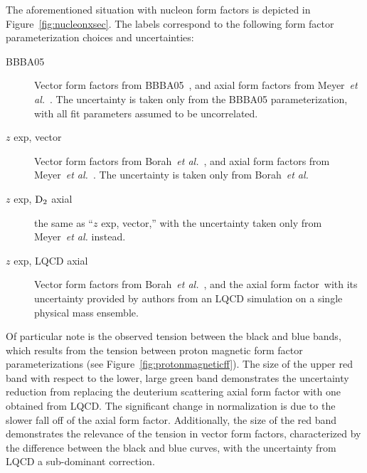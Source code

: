 \documentclass{ar-1col}
\newcommand{\change}[1]{{\color{red} #1}}
\def\asm#1{{\color{blue}#1}}
\def\del#1{}
\def\done#1{{\color{brown}#1}}
\begin{document}
The aforementioned situation with nucleon form factors is depicted in Figure~\ref{fig:nucleonxsec}.
The labels correspond to the following form factor parameterization choices and uncertainties:
\begin{description}
 \item[BBBA05] Vector form factors from BBBA05~\cite{Bradford:2006yz},
 and axial form factors from Meyer~{\it et al.}~\cite{Meyer:2016oeg}.
 The uncertainty is taken \asm{only} from \asm{the} BBBA05 \asm{parameterization},
 with all fit parameters assumed to be uncorrelated.
 \item[$z$ exp, vector] Vector form factors from Borah~{\it et al.}~\cite{Borah:2020gte},
 and axial form factors from Meyer~{\it et al.}~\cite{Meyer:2016oeg}.
 The uncertainty is taken \asm{only} from Borah~{\it et al.}
 \item[$z$ exp, ${\rm D}_{2}$ axial] \asm{the same} as ``$z$ exp, vector,''
 with the uncertainty taken \asm{only} from Meyer~{\it et al.} instead.
 \item[$z$ exp, LQCD axial] Vector form factors from Borah~{\it et al.}~\cite{Borah:2020gte},
 \asm{and the} axial form factor\del{s and their}\asm{~with its} uncertainty
 provided by authors from an LQCD simulation on a single physical mass ensemble.
\end{description}
Of particular note is the observed tension between the black and blue bands,
 which results from the tension between proton magnetic form factor parameterizations
 (see Figure~\ref{fig:protonmagneticff}).
The size of the \done{upper} red band with respect to the \done{lower, large} green band demonstrates the uncertainty reduction from replacing the deuterium scattering axial form factor with one obtained from LQCD. \del{and}The significant change in normalization is due to the slower fall off of the axial form factor.
Additionally, the size of the red band demonstrates the relevance of the tension in vector form factors, characterized by the difference between the black and blue curves, \change{with the uncertainty from LQCD a sub-dominant correction}\asm{{\bf [This is comparable, not subdominant?]}}.
\end{document}
